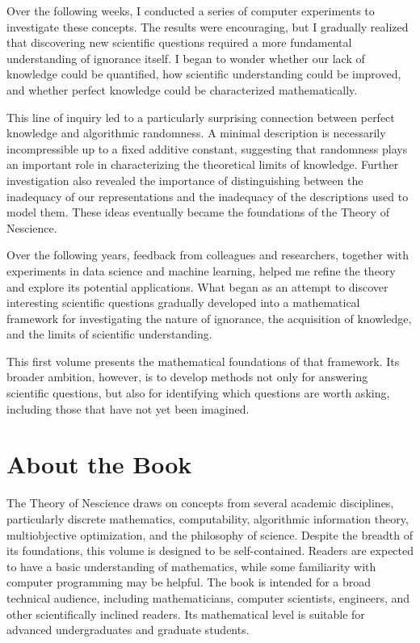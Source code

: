 Over the following weeks, I conducted a series of computer experiments to investigate these concepts. The results were encouraging, but I gradually realized that discovering new scientific questions required a more fundamental understanding of ignorance itself. I began to wonder whether our lack of knowledge could be quantified, how scientific understanding could be improved, and whether perfect knowledge could be characterized mathematically.

This line of inquiry led to a particularly surprising connection between perfect knowledge and algorithmic randomness. A minimal description is necessarily incompressible up to a fixed additive constant, suggesting that randomness plays an important role in characterizing the theoretical limits of knowledge. Further investigation also revealed the importance of distinguishing between the inadequacy of our representations and the inadequacy of the descriptions used to model them. These ideas eventually became the foundations of the Theory of Nescience.

Over the following years, feedback from colleagues and researchers, together with experiments in data science and machine learning, helped me refine the theory and explore its potential applications. What began as an attempt to discover interesting scientific questions gradually developed into a mathematical framework for investigating the nature of ignorance, the acquisition of knowledge, and the limits of scientific understanding.

This first volume presents the mathematical foundations of that framework. Its broader ambition, however, is to develop methods not only for answering scientific questions, but also for identifying which questions are worth asking, including those that have not yet been imagined.

%
%

\section*{About the Book}

The Theory of Nescience draws on concepts from several academic disciplines, particularly discrete mathematics, computability, algorithmic information theory, multiobjective optimization, and the philosophy of science. Despite the breadth of its foundations, this volume is designed to be self-contained. Readers are expected to have a basic understanding of mathematics, while some familiarity with computer programming may be helpful. The book is intended for a broad technical audience, including mathematicians, computer scientists, engineers, and other scientifically inclined readers. Its mathematical level is suitable for advanced undergraduates and graduate students.

